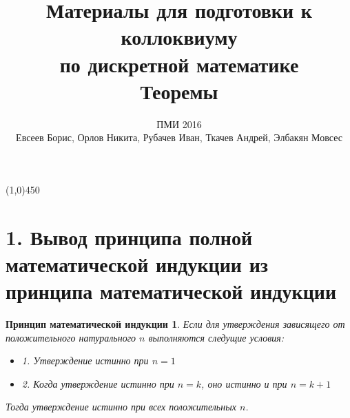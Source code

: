 \documentclass[a4paper,12pt]{article}
\newtheorem*{Induction_def} {Принцип математической индукции}
\begin{document}
	\title{Материалы для подготовки к коллоквиуму\\ по дискретной математике \\
	Теоремы}
	\author{ПМИ 2016 \\ Евсеев Борис, Орлов Никита, Рубачев Иван, Ткачев Андрей, Элбакян Мовсес}
	\maketitle

	\section*{}


	\begin{center}
		\line(1,0){450}
	\end{center}

    \newpage
	\section{1. Вывод принципа полной математической индукции из принципа математической индукции}

	\begin{Induction_def}
		Если для утверждения зависящего от положительного натурального $n$ выполняются следущие условия:
		\begin{itemize}
			\item 1. Утверждение истинно при $n = 1$
			\item 2. Когда утверждение истинно при $n = k$, оно истинно и при $n = k + 1$
		\end{itemize}
		Тогда утверждение истинно при всех положительных $n$.
	\end{Induction_def}
\end{document}
